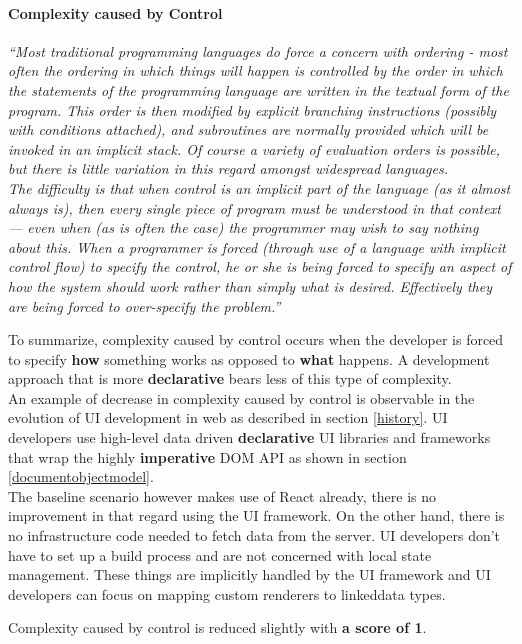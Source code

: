 \paragraph{Complexity caused by Control}
\textit{``Most traditional programming languages do force a concern with ordering - most often the ordering in which things will happen is controlled by the order in which the statements of the programming language are written in the textual form of the program. This order is then modified by explicit branching instructions (possibly with conditions attached), and subroutines are normally provided which will be invoked in an implicit stack. Of course a variety of evaluation orders is possible, but there is little variation in this regard amongst widespread languages. \\ The difficulty is that when control is an implicit part of the language (as it almost always is), then every single piece of program must be understood in that context — even when (as is often the case) the programmer may wish to say nothing about this. When a programmer is forced (through use of a language with implicit control flow) to specify the control, he or she is being forced to specify an aspect of how the system should work rather than simply what is desired. Effectively they are being forced to over-specify the problem.''} \citep[p.~8]{outoftarpit}

To summarize, complexity caused by control occurs when the developer is forced to specify \textbf{how} something works as opposed to \textbf{what} happens. A development approach that is more \textbf{declarative} bears less of this type of complexity. \\
An example of decrease in complexity caused by control is observable in the evolution of UI development in web as described in section \ref{history}. UI developers use high-level data driven \textbf{declarative} UI libraries and frameworks that wrap the highly \textbf{imperative} DOM API as shown in section \ref{documentobjectmodel}. \\
The baseline scenario however makes use of React already, there is no improvement in that regard using the UI framework. On the other hand, there is no infrastructure code needed to fetch data from the server. UI developers don't have to set up a build process and are not concerned with local state management. These things are implicitly handled by the UI framework and UI developers can focus on mapping custom renderers to \gls{linkeddata} types.

Complexity caused by control is reduced slightly with \textbf{a score of 1}.

